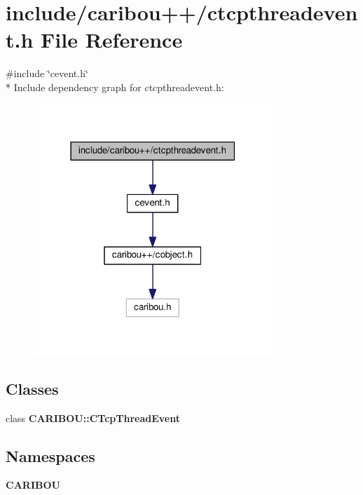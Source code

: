 \section{include/caribou++/ctcpthreadevent.h File Reference}
\label{ctcpthreadevent_8h}
{\ttfamily \#include \char`\"{}cevent.\+h\char`\"{}}\\*
Include dependency graph for ctcpthreadevent.\+h\+:
\nopagebreak
\begin{figure}[H]
\begin{center}
\leavevmode
\includegraphics[width=255pt]{ctcpthreadevent_8h__incl}
\end{center}
\end{figure}
\subsection*{Classes}
\begin{DoxyCompactItemize}
\item 
class {\bf C\+A\+R\+I\+B\+O\+U\+::\+C\+Tcp\+Thread\+Event}
\end{DoxyCompactItemize}
\subsection*{Namespaces}
\begin{DoxyCompactItemize}
\item 
 {\bf C\+A\+R\+I\+B\+OU}
\end{DoxyCompactItemize}
